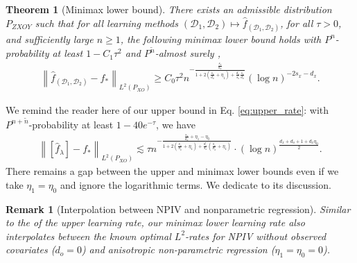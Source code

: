 \documentclass[11pt]{article}
\newcommand{\stageonesamples}{\tilde{n}}
\newcommand{\0}{\mathbf{0}}
\newtheorem{thm}{Theorem}[section]
\newtheorem{rem}{Remark}[section]
\begin{document}
\begin{thm}[Minimax lower bound]\label{thm:lower_rate} 
There exists an \emph{admissible} distribution $P_{ZXOY}$ such that for all learning methods $(\mathcal{D}_1,\mathcal{D}_2) \mapsto \hat{f}_{(\mathcal{D}_1,\mathcal{D}_2)}$, for all $\tau>0$, and sufficiently large $n\geq 1$, the following minimax lower bound holds with $P^{n}$-probability at least $1- C_1 \tau^2$ and $P^{\tilde{n}}$-almost surely ,
\begin{align}
\label{eq:minimax_lower_rate}
    \left\| \hat{f}_{(\mathcal{D}_1,\mathcal{D}_2)} - f_\ast \right\|_{L^2(P_{XO})} \geq C_0 \tau^2 n^{-\frac{\frac{s_x}{d_x}}{1+2(\frac{s_x}{d_x}+\eta_1)+\frac{d_o}{s_o}\frac{s_x}{d_x}}} (\log n)^{-2s_x - d_x} .
\end{align}
\end{thm}


We remind the reader here of our upper bound in Eq. \eqref{eq:upper_rate}: with $P^{n+\stageonesamples}$-probability at least $1- 40e^{-\tau}$, we have
\begin{align*}
    \left\|\left[\hat{f}_{\lambda}\right] - f_{\ast}\right\|_{L^2(P_{XO})} \lesssim \tau n^{-\frac{\frac{s_x}{d_x}+\eta_1-\eta_0}{1+2(\frac{s_x}{d_x}+\eta_1)+\frac{d_o}{s_o}(\frac{s_x}{d_x}+\eta_1)}} \cdot (\log n)^{\frac{d_x+d_o+1+d_x\eta_0}{2}} .
\end{align*}
There remains a gap between the upper and minimax lower bounds even if we take $\eta_1 = \eta_0$ and ignore the logarithmic terms. We dedicate  to its discussion. 

\begin{rem}[Interpolation between NPIV and nonparametric regression] \label{rem:lb_main_rem}
    Similar to the  of the upper learning rate, 
    our minimax lower learning rate also interpolates between the known optimal $L^2$-rates for NPIV without observed covariates ($d_o = 0$) and anisotropic
    non-parametric regression ($\eta_1 = \eta_0 = 0$). 
\end{rem}
\end{document}
